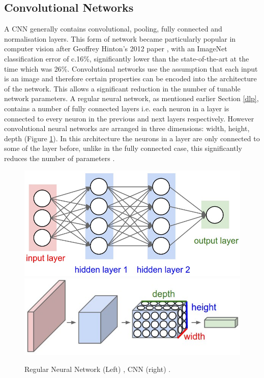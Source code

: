 \documentclass[11pt,twoside]{report}
\begin{document}
\subsection{Convolutional Networks} \label{Cnn_section}
A CNN generally contains convolutional, pooling, fully connected and normalisation layers. This form of network became particularly popular in computer vision after Geoffrey Hinton's 2012 paper \cite{GH_CNN}, with an ImageNet classification error of c.16\%, significantly lower than the state-of-the-art at the time which was 26\%. Convolutional networks use the assumption that each input is an image and therefore certain properties can be encoded into the architecture of the network. This allows a significant reduction in the number of tunable network parameters.
\newline \newline
A regular neural network, as mentioned earlier Section \ref{dlp}, contains a number of fully connected layers i.e. each neuron in a layer is connected to every neuron in the previous and next layers respectively. However convolutional neural networks are arranged in three dimensions: width, height, depth (Figure \ref{CNNvsNN}). In this architecture the neurons in a layer are only connected to some of the layer before, unlike in the fully connected case, this significantly reduces the number of parameters \cite{StanfordCS231_1}.

\noindent \begin{figure}[h!]
	\includegraphics[width = 0.5\hsize]{./figures/neural_net2.jpeg}
	\includegraphics[width = 0.5\hsize]{./figures/cnn.jpeg}
	\caption{Regular Neural Network (Left) \cite{StanfordCS231_1} , CNN (right) \cite{StanfordCS231_1}.}
	\label{CNNvsNN}
\end{figure}
\end{document}
